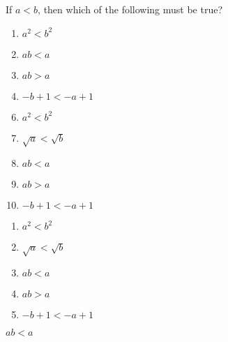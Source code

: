 

  If $a<b$, then which of the following must be true?


\ifsat
	\begin{enumerate}[label=\Alph*)]
		\item    $a^{2}<b^{2}$
		\item $ab<a$ %
		\item $ab>a$
		\item  $-b+1<-a+1$ 
	\end{enumerate}
\else
\fi

\ifacteven
	\begin{enumerate}[label=\textbf{\Alph*.},itemsep=\fill,align=left]
		\setcounter{enumii}{5}
		\item    $a^{2}<b^{2}$
		\item  $\sqrt{a}<\sqrt{b}$ 
		\item $ab<a$ %
		\addtocounter{enumii}{1}
		\item $ab>a$
		\item  $-b+1<-a+1$ 
	\end{enumerate}
\else
\fi

\ifactodd
	\begin{enumerate}[label=\textbf{\Alph*.},itemsep=\fill,align=left]
		\item    $a^{2}<b^{2}$
		\item  $\sqrt{a}<\sqrt{b}$ 
		\item $ab<a$ %
		\item $ab>a$
		\item  $-b+1<-a+1$ 
	\end{enumerate}
\else
\fi

\ifgridin
 $ab<a$ %
		
\else
\fi

